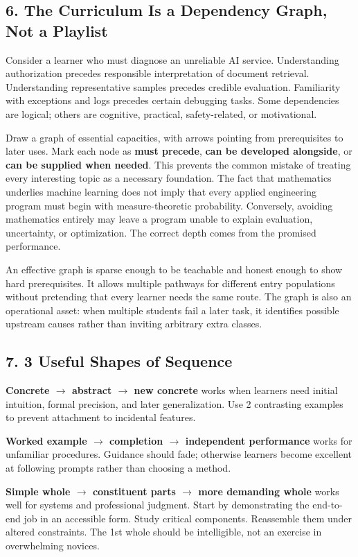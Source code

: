 \subsection*{6. The Curriculum Is a Dependency Graph, Not a Playlist}

Consider a learner who must diagnose an unreliable AI service. Understanding authorization precedes responsible interpretation of document retrieval. Understanding representative samples precedes credible evaluation. Familiarity with exceptions and logs precedes certain debugging tasks. Some dependencies are logical; others are cognitive, practical, safety-related, or motivational.

Draw a graph of essential capacities, with arrows pointing from prerequisites to later uses. Mark each node as \textbf{must precede}, \textbf{can be developed alongside}, or \textbf{can be supplied when needed}. This prevents the common mistake of treating every interesting topic as a necessary foundation. The fact that mathematics underlies machine learning does not imply that every applied engineering program must begin with measure-theoretic probability. Conversely, avoiding mathematics entirely may leave a program unable to explain evaluation, uncertainty, or optimization. The correct depth comes from the promised performance.

An effective graph is sparse enough to be teachable and honest enough to show hard prerequisites. It allows multiple pathways for different entry populations without pretending that every learner needs the same route. The graph is also an operational asset: when multiple students fail a later task, it identifies possible upstream causes rather than inviting arbitrary extra classes.

\subsection*{7. 3 Useful Shapes of Sequence}

\textbf{Concrete $\to$ abstract $\to$ new concrete} works when learners need initial intuition, formal precision, and later generalization. Use 2 contrasting examples to prevent attachment to incidental features.

\textbf{Worked example $\to$ completion $\to$ independent performance} works for unfamiliar procedures. Guidance should fade; otherwise learners become excellent at following prompts rather than choosing a method.

\textbf{Simple whole $\to$ constituent parts $\to$ more demanding whole} works well for systems and professional judgment. Start by demonstrating the end-to-end job in an accessible form. Study critical components. Reassemble them under altered constraints. The 1st whole should be intelligible, not an exercise in overwhelming novices.

